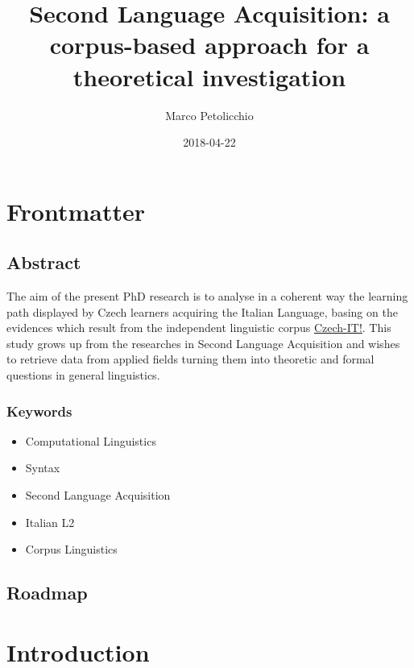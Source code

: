 \documentclass[a4paper,twoside,11pt,chapterprefix=true,listof=totocnumbered,bibliography=totocnumbered]{scrbook}
\title{Second Language Acquisition: a corpus-based approach for a theoretical
investigation}
\author{Marco Petolicchio}
\date{2018-04-22}
\providecommand{\tightlist}{%
  \setlength{\itemsep}{0pt}\setlength{\parskip}{0pt}}
\theoremstyle{definition}
\theoremstyle{definition}
\theoremstyle{definition}
\theoremstyle{remark}
\begin{document}
\maketitle

{
\setcounter{tocdepth}{1}
\tableofcontents
}
\chapter*{Frontmatter}\label{frontmatter}

\section*{Abstract}\label{abstract}

The aim of the present PhD research is to analyse in a coherent way the
learning path displayed by Czech learners acquiring the Italian
Language, basing on the evidences which result from the independent
linguistic corpus \href{http://czech-it.github.io}{Czech-IT!}. This
study grows up from the researches in Second Language Acquisition and
wishes to retrieve data from applied fields turning them into theoretic
and formal questions in general linguistics.

\subsection*{Keywords}\label{keywords}

\begin{itemize}
\tightlist
\item
  Computational Linguistics
\item
  Syntax
\item
  Second Language Acquisition
\item
  Italian L2
\item
  Corpus Linguistics
\end{itemize}

\section*{Roadmap}\label{roadmap}

\chapter{Introduction}\label{introduction}
\end{document}
